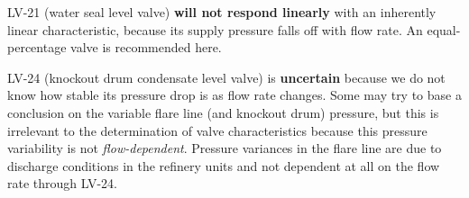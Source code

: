 \vskip 10pt

LV-21 (water seal level valve) {\bf will not respond linearly} with an inherently linear characteristic, because its supply pressure falls off with flow rate.  An equal-percentage valve is recommended here.

\vskip 10pt

LV-24 (knockout drum condensate level valve) is {\bf uncertain} because we do not know how stable its pressure drop is as flow rate changes.  Some may try to base a conclusion on the variable flare line (and knockout drum) pressure, but this is irrelevant to the determination of valve characteristics because this pressure variability is not {\it flow-dependent}.  Pressure variances in the flare line are due to discharge conditions in the refinery units and not dependent at all on the flow rate through LV-24.




